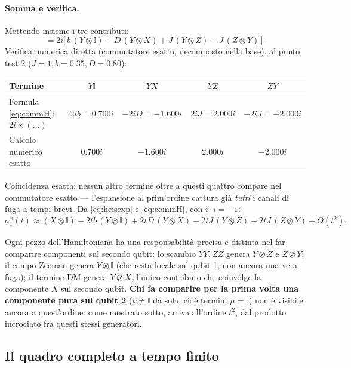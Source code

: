 \documentclass[11pt,a4paper]{article}
\begin{document}
\paragraph{Somma e verifica.} Mettendo insieme i tre contributi:
\begin{equation}
[H,\sigma_1^x]=2i\Big[\,b\,(Y{\otimes}\mathbb I)-D\,(Y{\otimes}X)+J\,(Y{\otimes}Z)-J\,(Z{\otimes}Y)\,\Big].
\label{eq:commH}
\end{equation}
Verifica numerica diretta (commutatore esatto, decomposto nella base), al punto test 2
($J=1,b=0.35,D=0.80$):
\begin{center}
\begin{tabular}{lcccc}
\toprule
Termine & $Y\mathbb I$ & $YX$ & $YZ$ & $ZY$\\
\midrule
Formula \eqref{eq:commH}: $2i\times(\ldots)$ & $2ib=0.700i$ & $-2iD=-1.600i$ & $2iJ=2.000i$ & $-2iJ=-2.000i$\\
Calcolo numerico esatto & $0.700i$ & $-1.600i$ & $2.000i$ & $-2.000i$\\
\bottomrule
\end{tabular}
\end{center}
Coincidenza esatta: nessun altro termine oltre a questi quattro compare nel commutatore esatto
--- l'espansione al prim'ordine cattura già \emph{tutti} i canali di fuga a tempi brevi. Da
\eqref{eq:heisexp} e \eqref{eq:commH}, con $i\cdot i=-1$:
\begin{equation}
\sigma_1^x(t)\approx (X{\otimes}\mathbb I)-2tb\,(Y{\otimes}\mathbb I)+2tD\,(Y{\otimes}X)
-2tJ\,(Y{\otimes}Z)+2tJ\,(Z{\otimes}Y)+O(t^2).
\label{eq:sigma1expand}
\end{equation}

\begin{ideabox}
Ogni pezzo dell'Hamiltoniana ha una responsabilità precisa e distinta nel far comparire
componenti sul secondo qubit: lo scambio $YY,ZZ$ genera $Y{\otimes}Z$ e $Z{\otimes}Y$; il campo
Zeeman genera $Y{\otimes}\mathbb I$ (che resta locale sul qubit 1, non ancora una vera fuga);
il termine DM genera $Y{\otimes}X$, l'unico contributo che coinvolge la componente $X$ sul
secondo qubit. \textbf{Chi fa comparire per la prima volta una componente pura sul qubit 2}
($\nu\neq\mathbb I$ da sola, cioè termini $\mu=\mathbb I$) non è visibile ancora a
quest'ordine: come mostrato sotto, arriva all'ordine $t^2$, dal prodotto incrociato fra questi
stessi generatori.
\end{ideabox}

\subsection{Il quadro completo a tempo finito}
\end{document}
